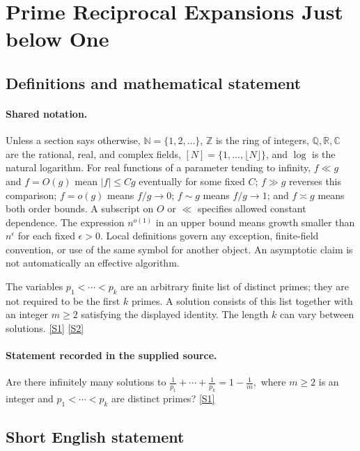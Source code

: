 \documentclass[11pt,a4paper]{article}
\newcommand{\N}{\mathbb{N}}
\newcommand{\Z}{\mathbb{Z}}
\newcommand{\Q}{\mathbb{Q}}
\newcommand{\R}{\mathbb{R}}
\newcommand{\C}{\mathbb{C}}
\newcommand{\sref}[2]{\hyperlink{source:#1:#2}{[S#2]}}
\begin{document}
\section{Prime Reciprocal Expansions Just below One}\label{statement}


\subsection{Definitions and mathematical statement}

\paragraph{Shared notation.}Unless a section says otherwise, $\N=\{1,2,\ldots\}$,
$\Z$ is the ring of integers, $\Q,\R,\C$ are the rational, real, and complex
fields, $[N]=\{1,\ldots,\lfloor N\rfloor\}$, and $\log$ is the natural
logarithm. For real functions of a parameter tending to infinity,
$f\ll g$ and $f=O(g)$ mean $|f|\leq Cg$ eventually for some fixed $C$;
$f\gg g$ reverses this comparison; $f=o(g)$ means $f/g\to0$;
$f\sim g$ means $f/g\to1$; and $f\asymp g$ means both order bounds.
A subscript on $O$ or $\ll$ specifies allowed constant dependence.
The expression $n^{o(1)}$ in an upper bound means growth smaller than
$n^\epsilon$ for each fixed $\epsilon>0$. Local definitions govern any
exception, finite-field convention, or use of the same symbol for another
object. An asymptotic claim is not automatically an effective algorithm.



The variables $p_1<\cdots<p_k$ are an arbitrary finite list of distinct primes; they are not required to be the first $k$ primes. A solution consists of this list together with an integer $m\geq2$ satisfying the displayed identity. The length $k$ can vary between solutions. \sref{statement}{1} \sref{statement}{2}

\paragraph{Statement recorded in the supplied source.}
Are there infinitely many solutions to $ \frac{1}{p_1}+\cdots+\frac{1}{p_k}=1-\frac{1}{m}, $ where $m\geq 2$ is an integer and $p_1<\cdots<p_k$ are distinct primes? \sref{statement}{1}

\subsection{Short English statement}
\end{document}
